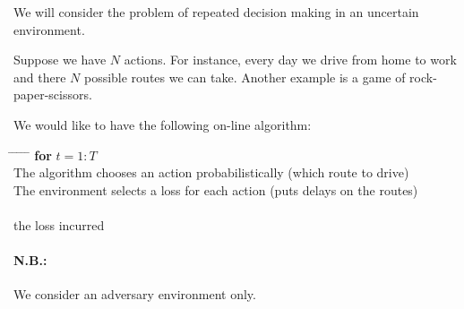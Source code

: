 
We will consider the problem of repeated decision making in an uncertain environment.

Suppose we have $N$ actions. For instance, every day we drive from home to work and there $N$ possible routes we can take. Another example is a game of rock-paper-scissors.

We would like to have the following on-line algorithm:
\begin{tabbing}
\hspace*{.25in} \= \hspace*{.25in} \= \hspace*{.25in} \= \hspace*{.25in} \= \hspace*{.25in} \=\kill
\> {\bf for} $t=1:T$\\
\>\> The algorithm chooses an action probabilistically (which route to drive)\\
\>\> The environment selects a loss for each action (puts delays on the routes)\\
 \\
 the loss incurred
\end{tabbing}
\paragraph{N.B.:} We consider an adversary environment only.

